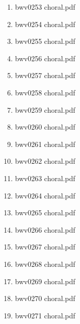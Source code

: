 \documentclass[11pt]{article}
\begin{document}
\begin{enumerate}
\begin{enumerate}
\begin{enumerate}
\begin{enumerate}
\item bwv0253 choral.pdf
\label{sec-1-1-1-1-44-6-7-2-4-4}

\item bwv0254 choral.pdf
\label{sec-1-1-1-1-44-6-7-2-4-5}

\item bwv0255 choral.pdf
\label{sec-1-1-1-1-44-6-7-2-4-6}

\item bwv0256 choral.pdf
\label{sec-1-1-1-1-44-6-7-2-4-7}

\item bwv0257 choral.pdf
\label{sec-1-1-1-1-44-6-7-2-4-8}

\item bwv0258 choral.pdf
\label{sec-1-1-1-1-44-6-7-2-4-9}

\item bwv0259 choral.pdf
\label{sec-1-1-1-1-44-6-7-2-4-10}

\item bwv0260 choral.pdf
\label{sec-1-1-1-1-44-6-7-2-4-11}

\item bwv0261 choral.pdf
\label{sec-1-1-1-1-44-6-7-2-4-12}

\item bwv0262 choral.pdf
\label{sec-1-1-1-1-44-6-7-2-4-13}

\item bwv0263 choral.pdf
\label{sec-1-1-1-1-44-6-7-2-4-14}

\item bwv0264 choral.pdf
\label{sec-1-1-1-1-44-6-7-2-4-15}

\item bwv0265 choral.pdf
\label{sec-1-1-1-1-44-6-7-2-4-16}

\item bwv0266 choral.pdf
\label{sec-1-1-1-1-44-6-7-2-4-17}

\item bwv0267 choral.pdf
\label{sec-1-1-1-1-44-6-7-2-4-18}

\item bwv0268 choral.pdf
\label{sec-1-1-1-1-44-6-7-2-4-19}

\item bwv0269 choral.pdf
\label{sec-1-1-1-1-44-6-7-2-4-20}

\item bwv0270 choral.pdf
\label{sec-1-1-1-1-44-6-7-2-4-21}

\item bwv0271 choral.pdf
\label{sec-1-1-1-1-44-6-7-2-4-22}


\end{enumerate}
\end{enumerate}
\end{enumerate}
\end{enumerate}
\end{document}
